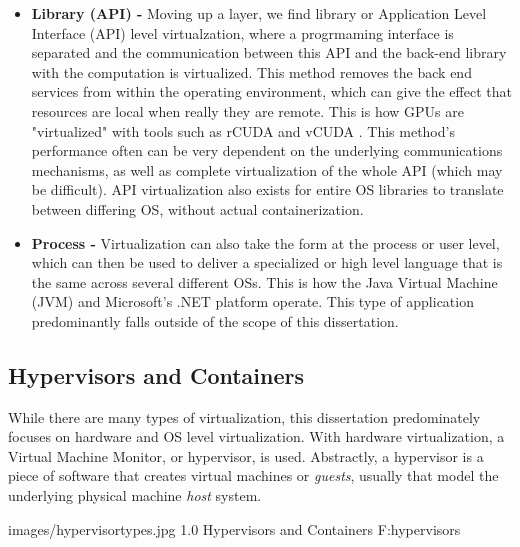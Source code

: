 \begin{itemize}
\item \textbf{Library (API) - }
Moving up a layer, we find library or Application Level Interface (API) level virtualzation, where a progrmaming interface is separated and the communication between this API and the back-end library with the computation is virtualized. This method removes the back end services from within the operating environment, which can give the effect that resources are local when really they are remote. This is how GPUs are "virtualized" with tools such as rCUDA \cite{duato2011enabling} and vCUDA \cite{shi2012vcuda}. This method's performance often can be very dependent on the underlying communications mechanisms, as well as complete virtualization of the whole API (which may be difficult).  API virtualization also exists for entire OS libraries to translate between differing OS, without actual containerization.   

\item \textbf{Process - }
Virtualization can also take the form at the process or user level, which can then be used to deliver a specialized or high level language that is the same across several different OSs. This is how the Java Virtual Machine (JVM) and Microsoft's .NET platform operate. This type of application predominantly falls outside of the scope of this dissertation. 

\end{itemize}



\subsection{Hypervisors and Containers}
\label{s:hypervisors}

While there are many types of virtualization, this dissertation predominately focuses on hardware and OS level virtualization. With hardware virtualization, a Virtual Machine Monitor, or hypervisor, is used. Abstractly, a hypervisor is a piece of software that creates virtual machines or \emph{guests}, usually that model the underlying physical machine \emph{host} system.  


  {images/hypervisortypes.jpg}
  {1.0}
  {Hypervisors and Containers}
  {F:hypervisors}

